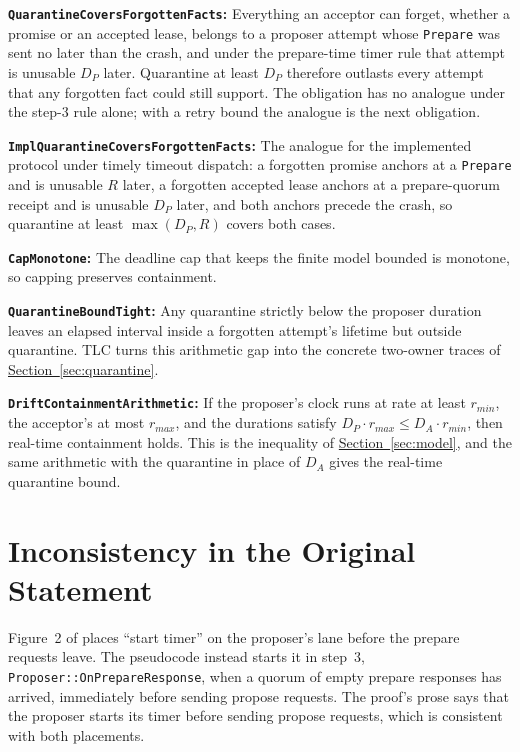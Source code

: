 \documentclass[final,5p,times,twocolumn,number]{elsarticle}
\newcommand{\code}[1]{\texttt{#1}}
\newcommand{\invitem}[1]{\smallskip\noindent\textbf{#1:} }
\newcommand{\secref}[1]{\hyperref[#1]{Section~\ref*{#1}}}
\begin{document}
\invitem{\code{QuarantineCoversForgottenFacts}}Everything an acceptor can forget, whether a promise or an accepted lease, belongs to a proposer attempt whose \code{Prepare} was sent no later than the crash, and under the prepare-time timer rule that attempt is unusable $D_P$ later.  Quarantine at least $D_P$ therefore outlasts every attempt that any forgotten fact could still support.  The obligation has no analogue under the step-3 rule alone; with a retry bound the analogue is the next obligation.

\invitem{\code{ImplQuarantineCoversForgottenFacts}}The analogue for the implemented protocol under timely timeout dispatch: a forgotten promise anchors at a \code{Prepare} and is unusable $R$ later, a forgotten accepted lease anchors at a prepare-quorum receipt and is unusable $D_P$ later, and both anchors precede the crash, so quarantine at least $\max(D_P, R)$ covers both cases.

\invitem{\code{CapMonotone}}The deadline cap that keeps the finite model bounded is monotone, so capping preserves containment.

\invitem{\code{QuarantineBoundTight}}Any quarantine strictly below the proposer duration leaves an elapsed interval inside a forgotten attempt's lifetime but outside quarantine.  TLC turns this arithmetic gap into the concrete two-owner traces of \secref{sec:quarantine}.

\invitem{\code{DriftContainmentArithmetic}}If the proposer's clock runs at rate at least $r_{min}$, the acceptor's at most $r_{max}$, and the durations satisfy $D_P \cdot r_{max} \leq D_A \cdot r_{min}$, then real-time containment holds.  This is the inequality of \secref{sec:model}, and the same arithmetic with the quarantine in place of $D_A$ gives the real-time quarantine bound.

\section{Inconsistency in the Original Statement}\label{app:latetimer}

Figure~2 of \cite{ref1} places ``start timer'' on the proposer's lane before the prepare requests leave.  The pseudocode instead starts it in step~3, \code{Proposer::OnPrepareResponse}, when a quorum of empty prepare responses has arrived, immediately before sending propose requests.  The proof's prose says that the proposer starts its timer before sending propose requests, which is consistent with both placements.
\end{document}
